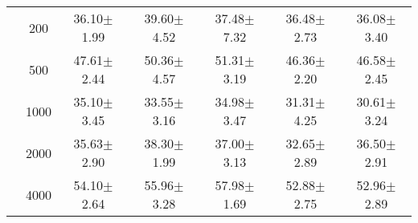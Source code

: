 \begin{table}[H]
\begin{tabular}{|c|c|c c c c c|}
\multicolumn{1}{|c|}{ \multirow{5}{*}{\rotatebox[origin=c]{90}{\textbf{Neurônios}}} }
&200	    &36.10$\pm$1.99	&39.60$\pm$4.52	&37.48$\pm$7.32	&36.48$\pm$2.73	&36.08$\pm$3.40	\\\cline{2-7}
&500	    &47.61$\pm$2.44 &50.36$\pm$4.57	&51.31$\pm$3.19	&46.36$\pm$2.20	&46.58$\pm$2.45	\\\cline{2-7}
&1000	&35.10$\pm$3.45	&33.55$\pm$3.16	&34.98$\pm$3.47	&31.31$\pm$4.25	&30.61$\pm$3.24 \\\cline{2-7}
&2000	&35.63$\pm$2.90	&38.30$\pm$1.99	&37.00$\pm$3.13	&32.65$\pm$2.89	&36.50$\pm$2.91	\\\cline{2-7}
&4000	&54.10$\pm$2.64	&55.96$\pm$3.28	&57.98$\pm$1.69	&52.88$\pm$2.75	&52.96$\pm$2.89	
\\\midrule
	\end{tabular}

\end{table}

